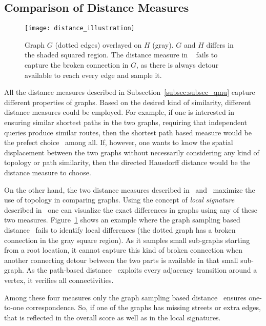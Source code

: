 \documentclass[natbib]{svjour3}                    \smartqed  \usepackage[table]{xcolor}
\begin{document}
\subsection{Comparison of Distance Measures}
\begin{figure}
\centering
\texttt{[image: distance\_illustration]}
\caption{Graph $G$ (dotted edges) overlayed on $H$ (gray). $G$ and $H$ differs in the shaded squared region. The distance measure in ~\cite{Biagioni:2012:MIF:2424321.2424333} fails to capture the broken connection in $G$, as there is always detour available to reach every edge and sample it.}
\label{fig:distance_illustration}
\end{figure}
All the distance measures described in Subsection~\ref{subsec:subsec_qmu} capture different properties of graphs.
Based on the desired kind of similarity, different distance measures could be employed.
For example, if one is interested in ensuring similar shortest paths in the two graphs, requiring that independent queries produce similar routes, then the  shortest path based measure would be the prefect choice~\cite{MondzechS11, Karagiorgou:2012:VTD:2424321.2424334} among 
all. If, however, one wants to know the spatial displacement between the two graphs without necessarily considering any kind of topology or path similarity, then the directed Hausdorff distance \cite{ag-dgsmi-99} would be the distance measure to choose.

On the other hand, the two distance measures described in~\cite{Biagioni:2012:MIF:2424321.2424333} and~\cite{aw-SIGSPATIAL-13} maximize the use of topology in comparing graphs. Using the concept of {\em local signature} described in~\cite{aw-SIGSPATIAL-13} one can visualize the exact differences in graphs using any of these two measures. Figure~\ref{fig:distance_illustration} shows an example where the graph sampling based distance~\cite{Biagioni:2012:MIF:2424321.2424333} fails to identify local differences (the dotted graph has a broken connection in the gray square region). As it samples small sub-graphs starting from a root location, it cannot capture this kind of broken connection when another connecting detour between the two parts is available in that small sub-graph. As 
the path-based distance~\cite{aw-SIGSPATIAL-13} exploits every adjacency transition around a vertex, it verifies all connectivities. 

Among these four measures only the graph sampling based distance~\cite{Biagioni:2012:MIF:2424321.2424333} ensures one-to-one correspondence. 
So, if one of the graphs has missing streets or extra edges, that is reflected in the overall score as well as in the local signatures.
\end{document}
